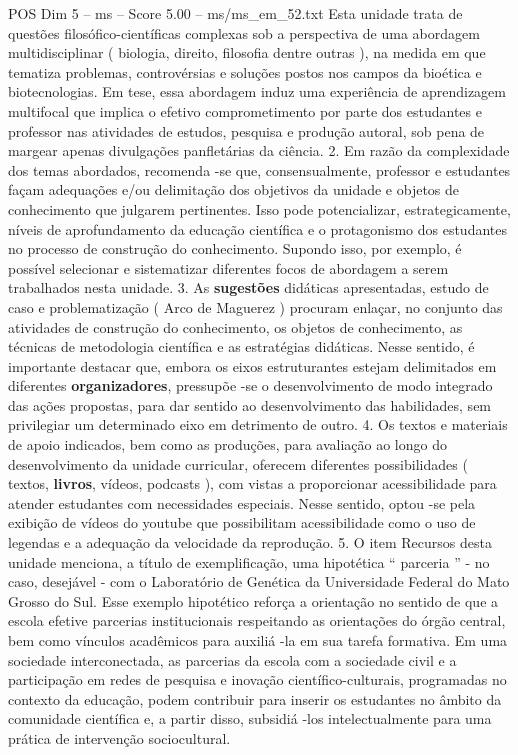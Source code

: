 \begin{textsample}{POS Dim 5 – ms – Score 5.00 – ms/ms\_em\_52.txt}
Esta unidade trata de questões filosófico-científicas complexas sob a perspectiva de uma abordagem multidisciplinar ( biologia, direito, filosofia dentre outras ), na medida em que tematiza problemas, controvérsias e soluções postos nos campos da bioética e biotecnologias.
Em tese, essa abordagem induz uma experiência de aprendizagem multifocal que implica o efetivo comprometimento por parte dos estudantes e professor nas atividades de estudos, pesquisa e produção autoral, sob pena de margear apenas divulgações panfletárias da ciência. 2.
Em razão da complexidade dos temas abordados, recomenda -se que, consensualmente, professor e estudantes façam adequações e/ou delimitação dos objetivos da unidade e objetos de conhecimento que julgarem pertinentes.
Isso pode potencializar, estrategicamente, níveis de aprofundamento da educação científica e o protagonismo dos estudantes no processo de construção do conhecimento.
Supondo isso, por exemplo, é possível selecionar e sistematizar diferentes focos de abordagem a serem trabalhados nesta unidade. 3.
As \textbf{sugestões} didáticas apresentadas, estudo de caso e problematização ( Arco de Maguerez ) procuram enlaçar, no conjunto das atividades de construção do conhecimento, os objetos de conhecimento, as técnicas de metodologia científica e as estratégias didáticas.
Nesse sentido, é importante destacar que, embora os eixos estruturantes estejam delimitados em diferentes \textbf{organizadores}, pressupõe -se o desenvolvimento de modo integrado das ações propostas, para dar sentido ao desenvolvimento das habilidades, sem privilegiar um determinado eixo em detrimento de outro. 4.
Os textos e materiais de apoio indicados, bem como as produções, para avaliação ao longo do desenvolvimento da unidade curricular, oferecem diferentes possibilidades ( textos, \textbf{livros}, vídeos, podcasts ), com vistas a proporcionar acessibilidade para atender estudantes com necessidades especiais.
Nesse sentido, optou -se pela exibição de vídeos do youtube que possibilitam acessibilidade como o uso de legendas e a adequação da velocidade da reprodução. 5.
O item Recursos desta unidade menciona, a título de exemplificação, uma hipotética “ parceria ” - no caso, desejável - com o Laboratório de Genética da Universidade Federal do Mato Grosso do Sul.
Esse exemplo hipotético reforça a orientação no sentido de que a escola efetive parcerias institucionais respeitando as orientações do órgão central, bem como vínculos acadêmicos para auxiliá -la em sua tarefa formativa.
Em uma sociedade interconectada, as parcerias da escola com a sociedade civil e a participação em redes de pesquisa e inovação científico-culturais, programadas no contexto da educação, podem contribuir para inserir os estudantes no âmbito da comunidade científica e, a partir disso, subsidiá -los intelectualmente para uma prática de intervenção sociocultural.

\end{textsample}
